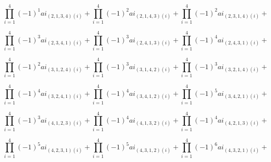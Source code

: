 \documentclass[12pt]{article}
\begin{document}
    $$\prod_{i=1}^{4} (-1)^1  ai_{(2, 1, 3, 4) (i)} + 
    \prod_{i=1}^{4} (-1)^2  ai_{(2, 1, 4, 3) (i)} +
    \prod_{i=1}^{4} (-1)^2  ai_{(2, 3, 1, 4) (i)} +$$
    
    $$\prod_{i=1}^{4} (-1)^3  ai_{(2, 3, 4, 1) (i)} + 
    \prod_{i=1}^{4} (-1)^3  ai_{(2, 4, 1, 3) (i)} +
    \prod_{i=1}^{4} (-1)^4  ai_{(2, 4, 3, 1) (i)} +$$
    
    $$\prod_{i=1}^{4} (-1)^2  ai_{(3, 1, 2, 4) (i)} + 
    \prod_{i=1}^{4} (-1)^3  ai_{(3, 1, 4, 2) (i)} +
    \prod_{i=1}^{4} (-1)^3  ai_{(3, 2, 1, 4) (i)} +$$
    
    $$\prod_{i=1}^{4} (-1)^4  ai_{(3, 2, 4, 1) (i)} + 
    \prod_{i=1}^{4} (-1)^4  ai_{(3, 4, 1, 2) (i)} +
    \prod_{i=1}^{4} (-1)^5  ai_{(3, 4, 2, 1)(i)} +$$
    
    $$\prod_{i=1}^{4} (-1)^3  ai_{(4, 1, 2, 3) (i)} + 
    \prod_{i=1}^{4} (-1)^4  ai_{(4, 1, 3, 2) (i)} +
    \prod_{i=1}^{4} (-1)^4  ai_{(4, 2, 1, 3) (i)} +$$
    
    $$\prod_{i=1}^{4} (-1)^5  ai_{(4, 2, 3, 1) (i)} + 
    \prod_{i=1}^{4} (-1)^5  ai_{(4, 3, 1, 2) (i)} +
    \prod_{i=1}^{4} (-1)^6  ai_{(4, 3, 2, 1) (i)} +$$

\newpage

\end{document}
